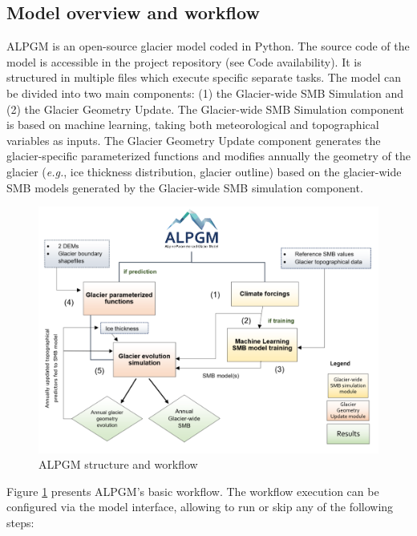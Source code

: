 \subsection{Model overview and workflow} \label{methods:methods:workflow}

ALPGM is an open-source glacier model coded in Python. The source code of the model is accessible in the project repository (see Code availability). It is structured in multiple files which execute specific separate tasks. The model can be divided into two main components: (1) the Glacier-wide SMB Simulation and (2) the Glacier Geometry Update. The Glacier-wide SMB Simulation component is based on machine learning, taking both meteorological and topographical variables as inputs. The Glacier Geometry Update component generates the glacier-specific parameterized functions and modifies annually the geometry of the glacier (\textit{e.g.}, ice thickness distribution, glacier outline) based on the glacier-wide SMB models generated by the Glacier-wide SMB simulation component.

\begin{figure}[t]
\centering
\includegraphics[width=14cm]{Figures/methods/Figure_1.png}
\caption{ALPGM structure and workflow}
\label{methods:fig1}
\end{figure}

Figure \ref{methods:fig1} presents ALPGM’s basic workflow. The workflow execution can be configured via the model interface, allowing to run or skip any of the following steps:


